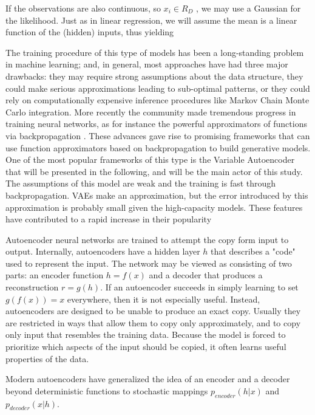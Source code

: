 
If the observations are also continuous, so $x_i \in R_D$ , we may use a Gaussian for the likelihood.
Just as in linear regression, we will assume the mean is a linear function of the (hidden) inputs,
thus yielding



The training procedure of this type of models has been a long-standing problem in machine learning; and, in general, most approaches have had three major drawbacks: they may require strong assumptions about the data structure, they could make serious approximations leading to sub-optimal patterns, or they could rely on computationally expensive inference procedures like Markov Chain Monte Carlo integration. More recently the community made tremendous progress in training neural networks, as for instance the powerful approximators of functions via backpropagation \cite{NIPS2012_4824}. These advances gave rise to promising frameworks that can use function approximators based on backpropagation to build generative models. One of the most popular frameworks of this type is the Variable Autoencoder \cite{} that will be presented in the following, and will be the main actor of this study. The assumptions of this model are weak and the training is fast through backpropagation. VAEs make an approximation, but the error introduced by this approximation is probably small given the high-capacity models. These features have contributed to a rapid increase in their popularity



Autoencoder neural networks are trained to attempt the copy form input to output. Internally, autoencoders have a hidden layer $h$ that describes a "code" used to represent the input. The network may be viewed as consisting of two parts: an encoder function $h=f(x)$ and a decoder that produces a reconstruction $r=g(h)$. If an autoencoder succeeds in simply learning to set $g(f(x))=x$ everywhere, then it is not especially useful. Instead, autoencoders are designed to be unable to produce an exact copy. Usually they are restricted in ways that allow them to copy only approximately, and to copy only input that resembles the training data. Because the model is forced to prioritize which aspects of the input should be copied, it often learns useful properties of the data.

Modern autoencoders have generalized the idea of an encoder and a decoder beyond deterministic functions to stochastic mappings $p_{encoder}(h | x)$ and $p_{decoder}(x | h)$.


